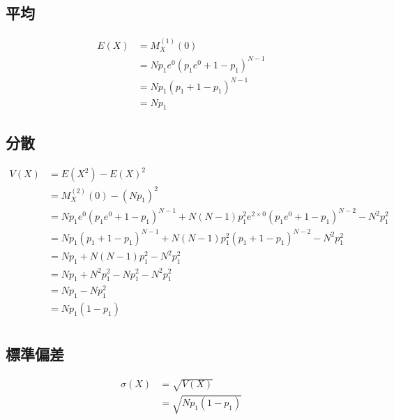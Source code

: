 \documentclass[dvipdfmx]{jsarticle}
\begin{document}
 \subsection{平均}
 \begin{align}
  E\left(X\right)&=M_X^{\left(1\right)}\left(0\right)\nonumber\\
  &=Np_1e^0\left(p_1e^0+1-p_1\right)^{N-1}\nonumber\\
  &=Np_1\left(p_1+1-p_1\right)^{N-1}\nonumber\\
  &=Np_1
 \end{align}
 \subsection{分散}
 \begin{align}
  V\left(X\right)&=E\left(X^2\right)-E\left(X\right)^2\nonumber\\
  &=M_X^{\left(2\right)}\left(0\right)-\left(Np_1\right)^2\nonumber\\
  &=Np_1e^0\left(p_1e^0+1-p_1\right)^{N-1}+N\left(N-1\right)p_1^2e^{2\times 0}\left(p_1e^0+1-p_1\right)^{N-2}-N^2p_1^2\nonumber\\
  &=Np_1\left(p_1+1-p_1\right)^{N-1}+N\left(N-1\right)p_1^2\left(p_1+1-p_1\right)^{N-2}-N^2p_1^2\nonumber\\
  &=Np_1+N\left(N-1\right)p_1^2-N^2p_1^2\nonumber\\
  &=Np_1+N^2p_1^2-Np_1^2-N^2p_1^2\nonumber\\
  &=Np_1-Np_1^2\nonumber\\
  &=Np_1\left(1-p_1\right)\nonumber\\
 \end{align}
 \subsection{標準偏差}
 \begin{align}
  \sigma\left(X\right)&=\sqrt{V\left(X\right)}\nonumber\\
  &=\sqrt{Np_1\left(1-p_1\right)}\nonumber\\
 \end{align}
\end{document}
